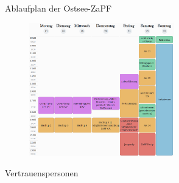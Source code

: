 \documentclass[compress, aspectratio=169]{beamer}
\begin{document}
	\begin{frame}{Ablaufplan der Ostsee-ZaPF}
		\begin{figure}
			\centering
			\includegraphics[height=5.8cm]{Woche2.png}
		\end{figure}
	\end{frame}
	
	
	
	\begin{frame}{Vertrauenspersonen} %
		\begin{figure}
			\centering
		\end{figure}
	\end{frame}
	
\end{document}
